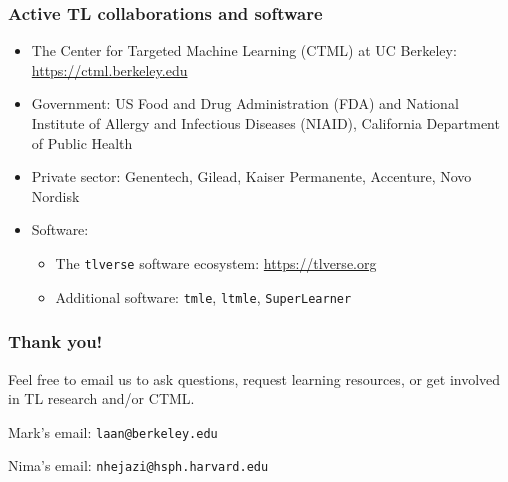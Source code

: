 \documentclass[t]{beamer}
\begin{document}
\begin{frame}
\frametitle{Active TL collaborations and software}
\begin{itemize}
\item The Center for Targeted Machine Learning (CTML) at UC Berkeley: \url{https://ctml.berkeley.edu}
\item Government: US Food and Drug Administration (FDA) and National Institute of Allergy and Infectious Diseases (NIAID), California Department of Public Health
\item Private sector: Genentech, Gilead, Kaiser Permanente, Accenture, Novo Nordisk
\item Software:
    \begin{itemize}
        \item The \texttt{tlverse} software ecosystem: \url{https://tlverse.org}
        \item Additional software: \texttt{tmle}, \texttt{ltmle}, \texttt{SuperLearner}
    \end{itemize}
    \end{itemize}
\end{frame}

\begin{frame}
\frametitle{Thank you!}
\vspace{10pt}
Feel free to email us to ask questions, request learning resources, or get
involved in TL research and/or CTML.

\vspace{10pt}
Mark's email: \texttt{laan@berkeley.edu}

\vspace{10pt}
Nima's email: \texttt{nhejazi@hsph.harvard.edu}




\end{frame}
\end{document}
